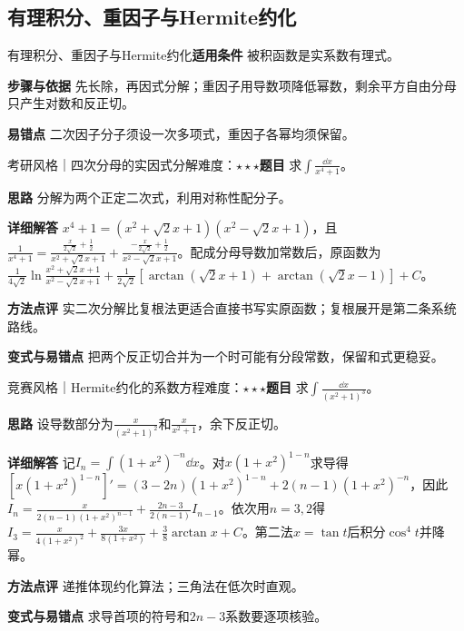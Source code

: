 \subsection{有理积分、重因子与Hermite约化}\label{deep:integral_source_deep:rational}

\begin{method}{有理积分、重因子与Hermite约化}\textbf{适用条件} 被积函数是实系数有理式。\par\textbf{步骤与依据} 先长除，再因式分解；重因子用导数项降低幂数，剩余平方自由分母只产生对数和反正切。\par\textbf{易错点} 二次因子分子须设一次多项式，重因子各幂均须保留。\end{method}

\begin{example}{考研风格｜四次分母的实因式分解}{难度：$\star\star\star$}\label{deep:ex:integral_source_deep:quartic}\textbf{题目} 求$\int\frac{\dd x}{x^4+1}$。\par\textbf{思路} 分解为两个正定二次式，利用对称性配分子。\par\textbf{详细解答} $x^4+1=(x^2+\sqrt2x+1)(x^2-\sqrt2x+1)$，且$\frac1{x^4+1}=\frac{\frac{x}{2\sqrt2}+\frac{1}{2}}{x^2+\sqrt2x+1}+\frac{-\frac{x}{2\sqrt2}+\frac{1}{2}}{x^2-\sqrt2x+1}$。配成分母导数加常数后，原函数为$\frac1{4\sqrt2}\ln\frac{x^2+\sqrt2x+1}{x^2-\sqrt2x+1}+\frac1{2\sqrt2}[\arctan(\sqrt2x+1)+\arctan(\sqrt2x-1)]+C$。\par\textbf{方法点评} 实二次分解比复根法更适合直接书写实原函数；复根展开是第二条系统路线。\par\textbf{变式与易错点} 把两个反正切合并为一个时可能有分段常数，保留和式更稳妥。\end{example}

\begin{example}{竞赛风格｜Hermite约化的系数方程}{难度：$\star\star\star$}\label{deep:ex:integral_source_deep:hermite}\textbf{题目} 求$\int\frac{\dd x}{(x^2+1)^3}$。\par\textbf{思路} 设导数部分为$\frac{x}{(x^2+1)^2}$和$\frac{x}{x^2+1}$，余下反正切。\par\textbf{详细解答} 记$I_n=\int(1+x^2)^{-n}\dd x$。对$x(1+x^2)^{1-n}$求导得$[x(1+x^2)^{1-n}]'=(3-2n)(1+x^2)^{1-n}+2(n-1)(1+x^2)^{-n}$，因此$I_n=\frac{x}{2(n-1)(1+x^2)^{n-1}}+\frac{2n-3}{2(n-1)}I_{n-1}$。依次用$n=3,2$得$I_3=\frac{x}{4(1+x^2)^2}+\frac{3x}{8(1+x^2)}+\frac38\arctan x+C$。第二法$x=\tan t$后积分$\cos^4t$并降幂。\par\textbf{方法点评} 递推体现约化算法；三角法在低次时直观。\par\textbf{变式与易错点} 求导首项的符号和$2n-3$系数要逐项核验。\end{example}

